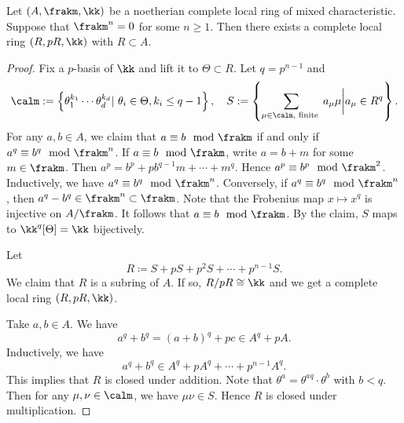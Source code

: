         \begin{lemma}\label{lem: coefficient ring in artin ring}
            Let \((A,\frakm,\kk)\) be a noetherian complete local ring of mixed characteristic.
            Suppose that \(\frakm^n = 0\) for some \(n \geq 1\).
            Then there exists a complete local ring \((R,pR,\kk)\) with \(R \subset A\).
        \end{lemma}
        \begin{proof}
            Fix a \(p\)-basis of \(\kk\) and lift it to \(\Theta \subset R\).
            Let \(q = p^{n-1}\) and 
            \[ \calm:= \left\{ \theta_1^{k_1} \cdots \theta_d^{k_d} | \ \theta_i \in \Theta, k_i \leq q-1 \right\},\quad S := \left\{ \sum_{\mu \in \calm,\text{ finite }} a_\mu \mu \bigg| a_\mu \in R^q \right\}. \]
            For any \(a,b \in A\), we claim that \(a \equiv b \mod \frakm\) if and only if \(a^q \equiv b^q \mod \frakm^n\).
            If \(a \equiv b \mod \frakm\), write \(a = b + m\) for some \(m \in \frakm\).
            Then \(a^p = b^p + p b^{q-1} m + \cdots + m^q\).
            Hence \(a^p \equiv b^p \mod \frakm^2\).
            Inductively, we have \(a^q \equiv b^q \mod \frakm^n\).
            Conversely, if \(a^q \equiv b^q \mod \frakm^n\), then \(a^q - b^q \in \frakm^n \subset \frakm\).
            Note that the Frobenius map \(x \mapsto x^q\) is injective on \(A/\frakm\).
            It follows that \(a \equiv b \mod \frakm\).
            By the claim, \(S\) maps to \(\kk^q[\Theta] = \kk\) bijectively.
            
            Let 
            \[ R \coloneqq S + pS + p^2 S + \cdots + p^{n-1} S. \]
            We claim that \(R\) is a subring of \(A\).
            If so, \(R/pR \cong \kk\) and we get a complete local ring \((R,pR,\kk)\).

            Take \(a,b \in A\).
            We have 
            \[ a^q + b^q = (a+b)^q + p c \in A^q + p A. \]
            Inductively, we have 
            \[ a^q + b^q \in A^q + p A^q + \cdots + p^{n-1} A^q. \]
            This implies that \(R\) is closed under addition.
            Note that \(\theta^a = \theta^{aq} \cdot \theta^b\) with \(b < q\).
            Then for any \(\mu,\nu \in \calm\), we have \(\mu \nu \in S\).
            Hence \(R\) is closed under multiplication.
        \end{proof}

